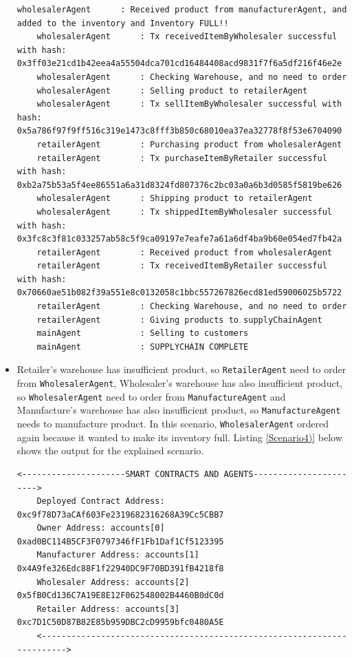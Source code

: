 \begin{itemize}
\begin{lstlisting}[caption={Agent Interaction (Scenario 3)},label={Scenario3}, numbers=none, basicstyle=\ttfamily\tiny]
    wholesalerAgent      : Received product from manufacturerAgent, and added to the inventory and Inventory FULL!!
    wholesalerAgent      : Tx receivedItemByWholesaler successful with hash: 0x3ff03e21cd1b42eea4a55504dca701cd16484408acd9831f7f6a5df216f46e2e
    wholesalerAgent      : Checking Warehouse, and no need to order
    wholesalerAgent      : Selling product to retailerAgent
    wholesalerAgent      : Tx sellItemByWholesaler successful with hash: 0x5a786f97f9ff516c319e1473c8fff3b850c68010ea37ea32778f8f53e6704090
    retailerAgent        : Purchasing product from wholesalerAgent
    retailerAgent        : Tx purchaseItemByRetailer successful with hash: 0xb2a75b53a5f4ee86551a6a31d8324fd807376c2bc03a0a6b3d0585f5819be626
    wholesalerAgent      : Shipping product to retailerAgent
    wholesalerAgent      : Tx shippedItemByWholesaler successful with hash: 0x3fc8c3f81c033257ab58c5f9ca09197e7eafe7a61a6df4ba9b60e054ed7fb42a
    retailerAgent        : Received product from wholesalerAgent
    retailerAgent        : Tx receivedItemByRetailer successful with hash: 0x70660ae51b082f39a551e8c0132058c1bbc557267826ecd81ed59006025b5722
    retailerAgent        : Checking Warehouse, and no need to order
    retailerAgent        : Giving products to supplyChainAgent
    mainAgent            : Selling to customers
    mainAgent            : SUPPLYCHAIN COMPLETE
    \end{lstlisting}
    
    \vspace{.5cm}

    \item Retailer's warehouse has insufficient product, so \texttt{RetailerAgent} need to order from \texttt{WholesalerAgent}, Wholesaler's warehouse has also insufficient product, so \texttt{WholesalerAgent} need to order from \texttt{ManufactureAgent} and Manufacture's warehouse has also insufficient product, so \texttt{ManufactureAgent} needs to manufacture product. In this scenario, \texttt{WholesalerAgent} ordered again because it wanted to make its inventory full. Listing \ref{Scenario4)} below shows the output for the explained scenario.

    \vspace{.5cm}
    \begin{lstlisting}[caption={Agent Interaction (Scenario 4},label={Scenario4}, numbers=none, basicstyle=\ttfamily\tiny]
    <---------------------SMART CONTRACTS AND AGENTS----------------------->
    Deployed Contract Address: 0xc9f78D73aCAf603Fe2319682316268A39Cc5CBB7
    Owner Address: accounts[0] 0xad0BC114B5CF3F0797346fF1Fb1Daf1Cf5123395
    Manufacturer Address: accounts[1] 0x4A9fe326Edc88F1f22940DC9F70BD391fB4218f8
    Wholesaler Address: accounts[2] 0x5fB0Cd136C7A19E8E12F062548002B4460B0dC0d
    Retailer Address: accounts[3] 0xc7D1C50D87B82E85b959DBC2cD9959bfc0480A5E
    <------------------------------------------------------------------------>
    

\end{lstlisting}
\end{itemize}
